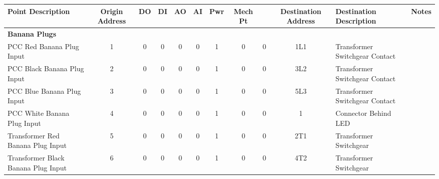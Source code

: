 \begin{table}[!htp]
{\begin{tabular}{lcccccccccll}
			\textbf{Point Description}          & \textbf{Origin Address} & \textbf{DO}                                 & \textbf{DI}                                & \textbf{AO} & \textbf{AI} & \textbf{Pwr} & \textbf{Mech Pt} &   & \textbf{Destination Address} & \textbf{Destination Description} & \textbf{Notes} \\ \midrule
			\textbf{Banana Plugs}               &                         &                                             &                                            &             &             &              &                  &   &                              &                                  &                \\ \midrule
			PCC Red Banana Plug Input           & 1                       & 0                                           & 0                                          & 0           & 0           & 1            & 0                & 0 & 1L1                          & Transformer Switchgear Contact   &                \\
			PCC Black Banana Plug Input         & 2                       & 0                                           & 0                                          & 0           & 0           & 1            & 0                & 0 & 3L2                          & Transformer Switchgear Contact   &                \\
			PCC Blue Banana Plug Input          & 3                       & 0                                           & 0                                          & 0           & 0           & 1            & 0                & 0 & 5L3                          & Transformer Switchgear Contact   &                \\
			PCC White Banana Plug Input         & 4                       & 0                                           & 0                                          & 0           & 0           & 1            & 0                & 0 & 1                            & Connector Behind LED             &                \\
			Transformer Red Banana Plug Input   & 5                       & 0                                           & 0                                          & 0           & 0           & 1            & 0                & 0 & 2T1                          & Transformer Switchgear           &                \\
			Transformer Black Banana Plug Input & 6                       & 0                                           & 0                                          & 0           & 0           & 1            & 0                & 0 & 4T2                          & Transformer Switchgear           &                \\

\end{tabular}}
\end{table}
